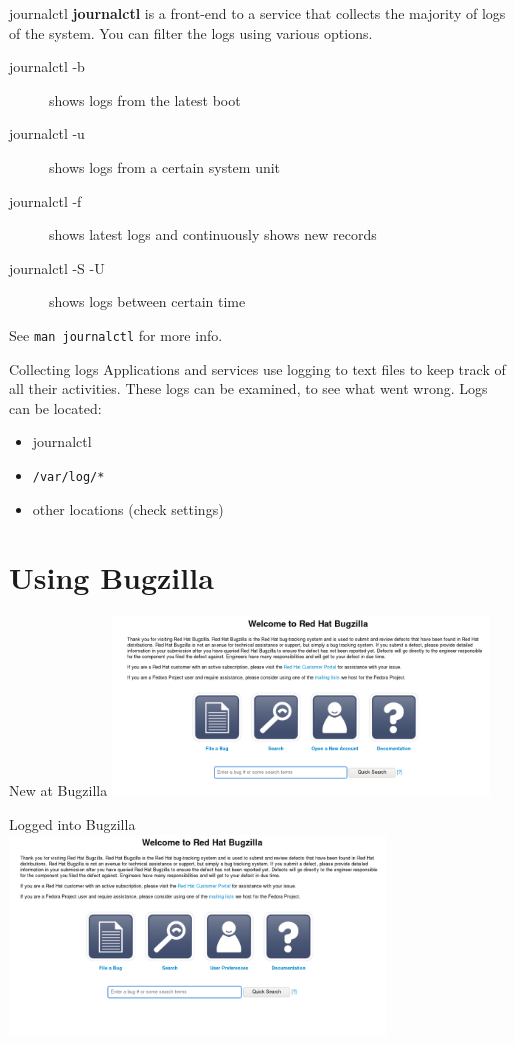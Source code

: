 \documentclass[12pt]{beamer}
\begin{document}
\begin{frame}{journalctl}
\textbf{journalctl} is a front-end to a service that collects the majority of logs of the system. You can filter the logs using various options.
\begin{description}
	\item[journalctl -b] shows logs from the latest boot
	\item[journalctl -u] shows logs from a certain system unit
	\item[journalctl -f] shows latest logs and continuously shows new records
	\item[journalctl -S -U] shows logs between certain time
\end{description}
See \texttt{man journalctl} for more info.
\end{frame}

\begin{frame}{Collecting logs}
Applications and services use logging to text files to keep track of all their activities. These logs can be examined, to see what went wrong. Logs can be located:
\begin{itemize}
	\item journalctl
	\item \texttt{/var/log/*}
	\item other locations (check settings)
\end{itemize}	
\end{frame}

\section{Using Bugzilla}
\begin{frame}{New at Bugzilla}
\includegraphics[width=10cm]{images/bz_new.png}
\end{frame}

\begin{frame}{Logged into Bugzilla}
\includegraphics[width=10cm]{images/bz_logged.png}
\end{frame}
\end{document}
